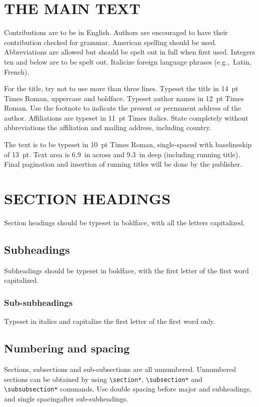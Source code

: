 \documentclass{ws-bme}
\begin{document}
\begin{multicols}{2}
\section*{THE MAIN TEXT}
Contributions are to be in English. Authors are
encouraged to have their contribution checked for grammar.
American spelling should be used. Abbreviations are allowed but
should be spelt out in full when first used. Integers ten and
below are to be spelt out. Italicize foreign language phrases
(e.g.,~Latin, French).

For the title, try
not to use more than three lines. Typeset the title in 14~pt Times
Roman, uppercase and boldface. Typeset author names in 12~pt Times Roman.
Use the footnote to indicate the present or permanent address of
the author. Affiliations are typeset in 11~pt Times italics. State completely without
abbreviations the affiliation and mailing address, including
country.

The text is to be typeset in 10~pt Times \hbox{Roman},
single-spaced with baselineskip of 13~pt. Text area is 6.9~in across and 9.3~in deep (including running
title). Final pagination and insertion of running titles will be
done by the publisher.

\section*{SECTION HEADINGS}
Section headings should be typeset in boldface, with all the
letters capitalized.

\subsection*{Subheadings}
Subheadings should be typeset in boldface, with the
first letter of the first word capitalized.

\subsubsection*{Sub-subheadings}
Typeset in italics and
capitalize the first letter of the first word only.

\subsection*{Numbering and spacing}
Sections, subsections and sub-subsections are all unnumbered.
Unnumbered sections can be obtained by using \verb|\section*|, \verb|\subsection*| and \verb|\subsubsection*| commands.
Use double spacing before major and subheadings, and single spacing\break after sub-subheadings.


\end{multicols}
\end{document}
